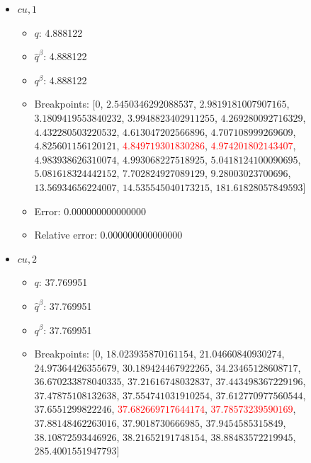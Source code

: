 \documentclass{article}%
\begin{document}
\begin{itemize}
\begin{itemize}
		\item $q^\beta$: 140.316853%
		\item Breakpoints: $[$$0$, $9.898970403313276$, $28.333333333333332$, $42.69900440382105$, $48.67452649027746$, $79.83702775273511$, $87.16107999267206$, $118.88765652962957$, $128.52021081477858$, $131.69760457629607$, $132.12228195956155$, $135.81963163113545$, $137.02923097052596$, \textcolor{red}{$139.47623233772285$}, \textcolor{red}{$140.7008934199032$}, $142.4338700260237$, $144.67005099128556$, $144.70843093515643$, $147.07009017600456$, $147.48374761404892$, $149.84689443310864$, $720.0$$]$%
		\item Error: 0.000000000000000%
		\item Relative error: 0.000000000000000%
	\end{itemize}%
	\item $\textit{cu},1$%
	\begin{itemize}%
		\item $q$: 4.888122%
		\item $\hat{q}^\beta$: 4.888122%
		\item $q^\beta$: 4.888122%
		\item Breakpoints: $[$$0$, $2.5450346292088537$, $2.9819181007907165$, $3.1809419553840232$, $3.9948823402911255$, $4.269280092716329$, $4.432280503220532$, $4.613047202566896$, $4.707108999269609$, $4.825601156120121$, \textcolor{red}{$4.849719301830286$}, \textcolor{red}{$4.974201802143407$}, $4.983938626310074$, $4.993068227518925$, $5.0418124100090695$, $5.081618324442152$, $7.702824927089129$, $9.28003023700696$, $13.56934656224007$, $14.535545040173215$, $181.61828057849593$$]$%
		\item Error: 0.000000000000000%
		\item Relative error: 0.000000000000000%
	\end{itemize}%
	\item $\textit{cu},2$%
	\begin{itemize}%
		\item $q$: 37.769951%
		\item $\hat{q}^\beta$: 37.769951%
		\item $q^\beta$: 37.769951%
		\item Breakpoints: $[$$0$, $18.023935870161154$, $21.04660840930274$, $24.97364426355679$, $30.189424467922265$, $34.23465128608717$, $36.670233878040335$, $37.21616748032837$, $37.443498367229196$, $37.47875108132638$, $37.554741031910254$, $37.612770977560544$, $37.6551299822246$, \textcolor{red}{$37.682669717644174$}, \textcolor{red}{$37.78573239590169$}, $37.88148462263016$, $37.9018730666985$, $37.9454585315849$, $38.10872593446926$, $38.21652191748154$, $38.88483572219945$, $285.4001551947793$$]$%

\end{itemize}
\end{itemize}
\end{document}
